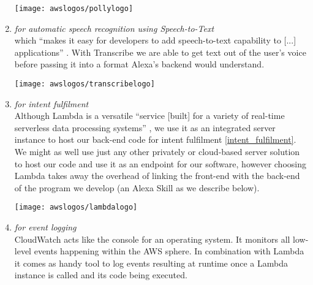 \begin{enumerate}
	
	\begin{restoretext}
		\begin{flushright}
		\texttt{[image: awslogos/pollylogo]}
		\end{flushright}
	\end{restoretext}
	
	
	\item[\href{https://aws.amazon.com/transcribe/}{\textbf{Transcribe}} \footnote{\url{https://aws.amazon.com/transcribe}}] \textit{for automatic speech recognition using Speech-to-Text}\\
	which ``makes it easy for developers to add speech-to-text capability to [...] applications'' \cite{aws_website}. With Transcribe we are able to get text out of the user's voice before passing it into a format Alexa's backend would understand.
	
	
	\begin{restoretext}
\begin{flushright}
	\texttt{[image: awslogos/transcribelogo]}
\end{flushright}
	\end{restoretext}
	
	
	\item[\href{https://aws.amazon.com/lambda/}{\textbf{Lambda}} \footnote{\url{https://aws.amazon.com/lambda}}] \textit{for intent fulfilment}\\
	Although Lambda is a versatile ``service [built] for a variety of real-time serverless data processing systems'' \cite{aws_website}, we use it as an integrated server instance to host our back-end code for intent fulfilment \ref{intent_fulfilment}. We might as well use just any other privately or cloud-based server solution to host our code and use it as an endpoint for our software, however choosing Lambda takes away the overhead of linking the front-end with the back-end of the program we develop (an Alexa Skill as we describe below). 
	
	
	\begin{restoretext}
\begin{flushright}
	\texttt{[image: awslogos/lambdalogo]}
\end{flushright}
	\end{restoretext}


	\item[\href{https://aws.amazon.com/iam/}{\textbf{CloudWatch}} \footnote{\url{https://aws.amazon.com/cloudwatch}}]
	\textit{for event logging}\\
	CloudWatch acts like the console for an operating system. It monitors all low-level events happening within the AWS sphere. In combination with Lambda it comes as handy tool to log events resulting at runtime once a Lambda instance is called and its code being executed.
	

\end{enumerate}
